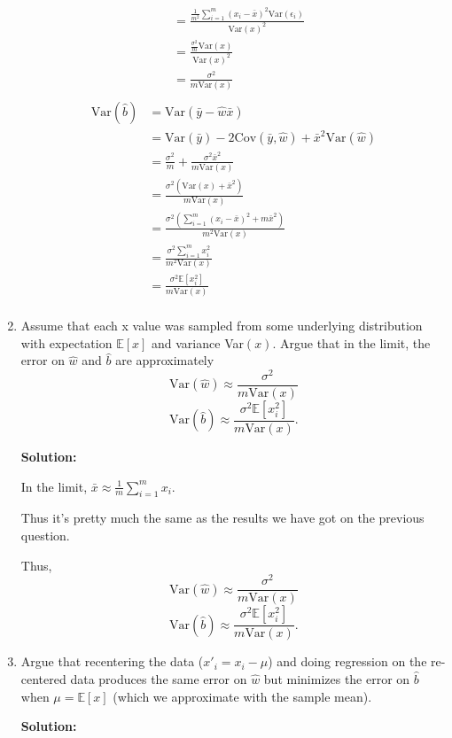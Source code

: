 \documentclass[letter, 12pt]{article}
\begin{document}
\begin{enumerate}
\begin{align*}
    		&= \frac{\frac{1}{m^2}\sum_{i=1}^{m} (x_i - \bar{x})^2\text{Var}(\epsilon_i)}{\text{Var}(x)^2} \\
    		&= \frac{\frac{\sigma^2}{m}\text{Var}(x)}{\text{Var}(x)^2} \\
    		&= \frac{\sigma^2}{m\text{Var}(x)} \\
    	\end{align*}
    	\begin{align*}
	    	\text{Var}(\hat{b}) &= \text{Var}(\bar{y} - \hat{w}\bar{x}) \\
	    	&= \text{Var}(\bar{y}) - 2\text{Cov}(\bar{y}, \hat{w}) + \bar{x}^2\text{Var}(\hat{w}) \\
	    	&= \frac{\sigma^2}{m} + \frac{\sigma^2\bar{x}^2}{m\text{Var}(x)} \\
	    	&= \frac{\sigma^2(\text{Var}(x) + \bar{x}^2)}{m\text{Var}(x)} \\
	    	&= \frac{\sigma^2(\sum_{i=1}^{m}(x_i - \bar{x})^2 + m\bar{x}^2)}{m^2\text{Var}(x)} \\
	    	&= \frac{\sigma^2\sum_{i=1}^{m}x_i^2}{m^2\text{Var}(x)} \\
	    	&= \frac{\sigma^2 \mathbb{E}[x_i^2]}{m\text{Var}(x)} \\
    	\end{align*}
    	
    	\item{Assume that each x value was sampled from some underlying distribution with expectation $ \mathbb{E}[x] $ and variance Var$ (x) $. Argue that in the limit, the error on $ \hat{w} $ and $ \hat{b} $ are approximately 
    		\[ \text{Var}(\hat{w}) \approx \frac{\sigma^2}{m\text{Var}(x)} \]
    		\[ \text{Var}(\hat{b}) \approx \frac{\sigma^2 \mathbb{E}[x_i^2]}{m\text{Var}(x)} .\]
    	}
    	\par{\textbf{Solution:}}
    	\par{In the limit, $ \bar{x} \approx \frac{1}{m} \sum_{i=1}^{m} x_i $.}
    	\par{Thus it's pretty much the same as the results we have got on the previous question.}
    	\par{Thus, \[ \text{Var}(\hat{w}) \approx \frac{\sigma^2}{m\text{Var}(x)} \]
    		\[ \text{Var}(\hat{b}) \approx \frac{\sigma^2 \mathbb{E}[x_i^2]}{m\text{Var}(x)} .\]}
    	
    	\item{Argue that recentering the data ($ x'_i = x_i − \mu $) and doing regression on the re-centered data produces the
    		same error on $ \hat{w} $ but minimizes the error on $ \hat{b} $ when $ \mu = \mathbb{E}[x] $ (which we approximate with the sample
    		mean).}
    	\par{\textbf{Solution:}}
    	

\end{enumerate}
\end{document}
